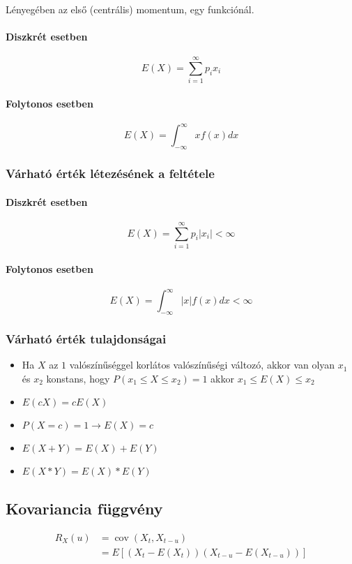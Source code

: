 \documentclass[11pt,a4pape,draftr]{article}
\begin{document}
				\paragraph{}
					Lényegében az első (centrális) momentum, egy funkciónál.
				\paragraph{Diszkrét esetben}
					$$E(X) = \sum_{i=1}^{\infty}p_i x_i$$
				\paragraph{Folytonos esetben}
					$$E(X) = \int_{-\infty}^{\infty}x f(x)dx$$
				\subsubsection{Várható érték létezésének a feltétele}
					\paragraph{Diszkrét esetben}
						$$E(X) = \sum_{i=1}^{\infty}p_i |x_i| < \infty$$
					\paragraph{Folytonos esetben}
						$$E(X) = \int_{-\infty}^{\infty}|x| f(x)dx < \infty$$
	
				\subsubsection{Várható érték tulajdonságai}
					\begin{itemize}
						\item Ha $X$ az $1$ valószínűséggel korlátos valószínűségi változó, akkor van olyan $x_1$ és $x_2$ konstans, hogy $P(x_1 \le X \le x_2)=1$ akkor $x_1 \le E(X) \le x_2$
						\item $E(cX)=cE(X)$
						\item $P(X=c) = 1 \to E(X)=c$
						\item $E(X+Y) = E(X) + E(Y)$
						\item $E(X*Y)=E(X)*E(Y)$
					\end{itemize}
	
			\subsection{Kovariancia függvény}
				$$ \begin{aligned}
					R_X(u) &= \operatorname{cov}(X_t, X_{t-u}) \\
					&= E[(X_t - E(X_t))(X_{t-u}-E(X_{t-u}))]
				\end{aligned} $$
	
\end{document}
